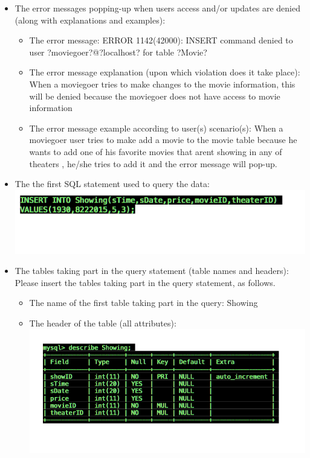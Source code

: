 {\begin{itemize}
\begin{itemize}
	  \item{The attributes of the table taking part in the query: }
	  genre,year,title
	 \end{itemize}
\item{}
	The error messages popping-up when users access and/or updates are denied (along with explanations and examples):
	\begin{itemize} 
	\item{The error message: }
	ERROR 1142(42000): INSERT command denied to user ?moviegoer?@?localhost? for table ?Movie?
	\item{The error message explanation (upon which violation does it take place): }
	When a moviegoer tries to make changes to the movie information, this will be denied because the moviegoer does not have access to movie information
	\item{The error message example according to user(s) scenario(s): }
	When a moviegoer user tries to make add a movie to the movie table because he wants to add one of his favorite movies that arent showing in any of theaters , he/she tries to add it and the error message will pop-up.
	 \end{itemize}
\item{The the first SQL statement used to query the data: }
	\includegraphics[scale=0.3]{insert2.png}
\item{The tables taking part in the query statement (table names and headers): }
	Please insert the tables taking part in the query statement, as follows.
	 \begin{itemize} 
	 \item{The name of the first table taking part in the query: }
	 Showing
	  \item{The header of the table  (all attributes): }
	\includegraphics[scale=0.3]{desshowing.png}

\end{itemize}
\end{itemize}}
